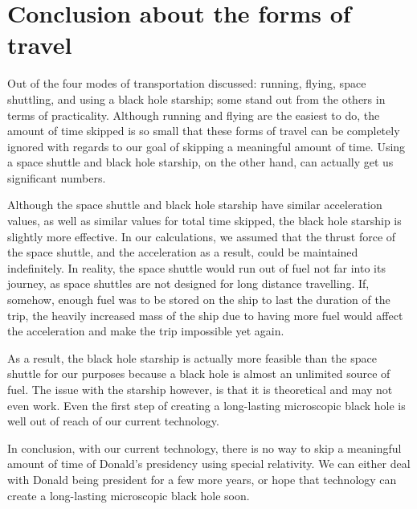 \chapter{Conclusion about the forms of travel}
	Out of the four modes of transportation discussed: running, flying, space shuttling, and using a black hole starship; some stand out from the others in terms of practicality. Although running and flying are the easiest to do, the amount of time skipped is so small that these forms of travel can be completely ignored with regards to our goal of skipping a meaningful amount of time. Using a space shuttle and black hole starship, on the other hand, can actually get us significant numbers.

	Although the space shuttle and black hole starship have similar acceleration values, as well as similar values for total time skipped, the black hole starship is slightly more effective. In our calculations, we assumed that the thrust force of the space shuttle, and the acceleration as a result, could be maintained indefinitely. In reality, the space shuttle would run out of fuel not far into its journey, as space shuttles are not designed for long distance travelling. If, somehow, enough fuel was to be stored on the ship to last the duration of the trip, the heavily increased mass of the ship due to having more fuel would affect the acceleration and make the trip impossible yet again.

	As a result, the black hole starship is actually more feasible than the space shuttle for our purposes because a black hole is almost an unlimited source of fuel. The issue with the starship however, is that it is theoretical and may not even work. Even the first step of creating a long-lasting microscopic black hole is well out of reach of our current technology.

	In conclusion, with our current technology, there is no way to skip a meaningful amount of time of Donald's presidency using special relativity. We can either deal with Donald being president for a few more years, or hope that technology can create a long-lasting microscopic black hole soon.
